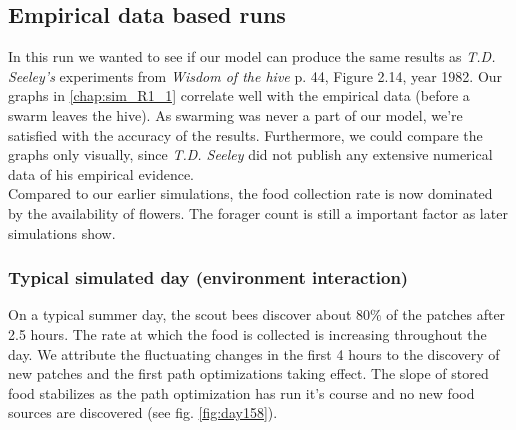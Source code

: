 \subsection{Empirical data based runs}
	In this run we wanted to see if our model can produce the same results as \textit{T.D. Seeley's} experiments from \textit{Wisdom of the hive} p. 44, Figure  2.14, year 1982. Our graphs in \ref{chap:sim_R1_1} correlate well with the empirical data (before a swarm leaves the hive). As swarming was never a part of our model, we're satisfied with the accuracy of the results. Furthermore, we could compare the graphs only visually, since \textit{T.D. Seeley} did not publish any  extensive numerical data of his empirical evidence.\\
	Compared to our earlier simulations, the food collection rate is now dominated by the availability of flowers. The forager count is still a important factor as later simulations show.
	
	\subsubsection{Typical simulated day (environment interaction)}
		On a typical summer day, the scout bees discover about $80\%$ of the patches after 2.5 hours. The rate at which the food is collected is increasing throughout the day. We attribute the fluctuating changes in the first 4 hours to the discovery of new patches and the first path optimizations taking effect. The slope of stored food stabilizes as the path optimization has run it's course and no new food sources are discovered (see fig. \ref{fig:day158}).\\
		
